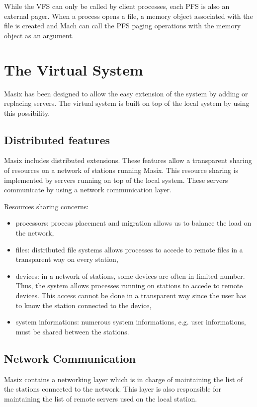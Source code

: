 	While the VFS can only be called by client processes, each PFS is also
an external pager. When a process opens a file, a memory object associated with
the file is created and Mach can call the PFS paging operations with the
memory object as an argument.

\section {The Virtual System}

	Masix has been designed to allow the easy extension of the system
by adding or replacing servers. The virtual system is built on top of the
local system by using this possibility.

\subsection {Distributed features}

	Masix includes distributed extensions. These features allow a
transparent sharing of resources on a network of stations running Masix. This
resource sharing is implemented by servers running on top of the local
system. These servers communicate by using a network communication layer.

	Resources sharing concerns:
\begin {itemize}
\item processors: process placement and migration allows us to balance the
load on the network,
\item files: distributed file systems allows processes to accede to remote
files in a transparent way on every station,
\item devices: in a network of stations, some devices are often in
limited number. Thus, the system allows processes running on stations to
accede to remote devices. This access cannot be done in a transparent way since
the user has to know the station connected to the device,
\item system informations: numerous system informations, e.g. user
informations, must be shared between the stations.
\end {itemize}

\subsection {Network Communication}
\label {subsection:comm}

	Masix contains a networking layer which is in charge of maintaining
the list of the stations connected to the network. This layer is also
responsible for maintaining the list of remote servers used on the local
station.

